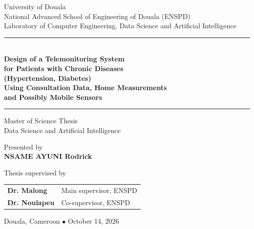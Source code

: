\documentclass[12pt,a4paper,oneside]{report}
\begin{document}
\begin{titlepage}
\centering
{}

{\normalsize University of Douala}\\[0.25cm]
{\normalsize National Advanced School of Engineering of Douala (ENSPD)}\\[0.25cm]
{\small Laboratory of Computer Engineering, Data Science and Artificial Intelligence}

\vspace{1.2cm}
\rule{\textwidth}{0.6pt}\\[0.6cm]

{\LARGE\bfseries Design of a Telemonitoring System\\[0.2cm]
for Patients with Chronic Diseases\\[0.2cm]
(Hypertension, Diabetes)}\\[0.4cm]
{\large\bfseries Using Consultation Data, Home Measurements\\[0.1cm]
and Possibly Mobile Sensors}

\vspace{0.6cm}
\rule{\textwidth}{0.6pt}

\vspace{1.2cm}
{\large Master of Science Thesis}\\[0.2cm]
{\normalsize Data Science and Artificial Intelligence}

\vspace{1.5cm}
{\normalsize Presented by}\\[0.3cm]
{\Large\bfseries NSAME AYUNI Rodrick}

\vspace{1.5cm}
{\normalsize Thesis supervised by}\\[0.4cm]

\begin{tabularx}{0.9\textwidth}{@{}l X@{}}
\textbf{Dr. Malong}   & Main supervisor, ENSPD \\[0.2cm]
\textbf{Dr. Noulapeu} & Co-supervisor, ENSPD \\
\end{tabularx}

\vfill
{\normalsize Douala, Cameroon \quad $\bullet$ \quad October 14, 2026}

\end{titlepage}

\tableofcontents
\clearpage
\end{document}
